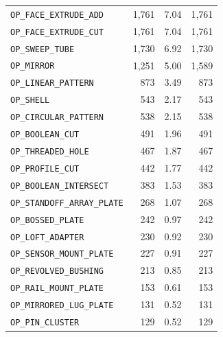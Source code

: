 \documentclass[preprint,12pt]{elsarticle}
\begin{document}
\begin{table}[htbp]
\begin{tabular}{lrrr}
    \texttt{OP\_FACE\_EXTRUDE\_ADD}     & 1{,}761   & 7.04                   & 1{,}761           \\
    \texttt{OP\_FACE\_EXTRUDE\_CUT}     & 1{,}761   & 7.04                   & 1{,}761           \\
    \texttt{OP\_SWEEP\_TUBE}            & 1{,}730   & 6.92                   & 1{,}730           \\
    \texttt{OP\_MIRROR}                 & 1{,}251   & 5.00                   & 1{,}589           \\
    \texttt{OP\_LINEAR\_PATTERN}        & 873       & 3.49                   & 873               \\
    \texttt{OP\_SHELL}                  & 543       & 2.17                   & 543               \\
    \texttt{OP\_CIRCULAR\_PATTERN}      & 538       & 2.15                   & 538               \\
    \texttt{OP\_BOOLEAN\_CUT}           & 491       & 1.96                   & 491               \\
    \texttt{OP\_THREADED\_HOLE}         & 467       & 1.87                   & 467               \\
    \texttt{OP\_PROFILE\_CUT}           & 442       & 1.77                   & 442               \\
    \texttt{OP\_BOOLEAN\_INTERSECT}     & 383       & 1.53                   & 383               \\
    \texttt{OP\_STANDOFF\_ARRAY\_PLATE} & 268       & 1.07                   & 268               \\
    \texttt{OP\_BOSSED\_PLATE}          & 242       & 0.97                   & 242               \\
    \texttt{OP\_LOFT\_ADAPTER}          & 230       & 0.92                   & 230               \\
    \texttt{OP\_SENSOR\_MOUNT\_PLATE}   & 227       & 0.91                   & 227               \\
    \texttt{OP\_REVOLVED\_BUSHING}      & 213       & 0.85                   & 213               \\
    \texttt{OP\_RAIL\_MOUNT\_PLATE}     & 153       & 0.61                   & 153               \\
    \texttt{OP\_MIRRORED\_LUG\_PLATE}   & 131       & 0.52                   & 131               \\
    \texttt{OP\_PIN\_CLUSTER}           & 129       & 0.52                   & 129               \\

\end{tabular}
\end{table}
\end{document}
